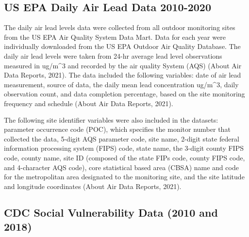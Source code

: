\documentclass[
  12pt,
]{article}
\begin{document}
\hypertarget{us-epa-daily-air-lead-data-2010-2020}{%
\subsection{US EPA Daily Air Lead Data
2010-2020}\label{us-epa-daily-air-lead-data-2010-2020}}

The daily air lead levels data were collected from all outdoor
monitoring sites from the US EPA Air Quality System Data Mart. Data for
each year were individually downloaded from the US EPA Outdoor Air
Quality Database. The daily air lead levels were taken from 24-hr
average lead level observations measured in ug/m\^{}3 and recorded by
the air quality System (AQS) (About Air Data Reports, 2021). The data
included the following variables: date of air lead measurement, source
of data, the daily mean lead concentration ug/m\^{}3, daily observation
count, and data completion percentage, based on the site monitoring
frequency and schedule (About Air Data Reports, 2021).

The following site identifier variables were also included in the
datasets: parameter occurrence code (POC), which specifies the monitor
number that collected the data, 5-digit AQS parameter code, site name,
2-digit state federal information processing system (FIPS) code, state
name, the 3-digit county FIPS code, county name, site ID (composed of
the state FIPs code, county FIPS code, and 4-character AQS code), core
statistical based area (CBSA) name and code for the metropolitan area
designated to the monitoring site, and the site latitude and longitude
coordinates (About Air Data Reports, 2021).

\hypertarget{cdc-social-vulnerability-data-2010-and-2018}{%
\subsection{CDC Social Vulnerability Data (2010 and
2018)}\label{cdc-social-vulnerability-data-2010-and-2018}}
\end{document}
